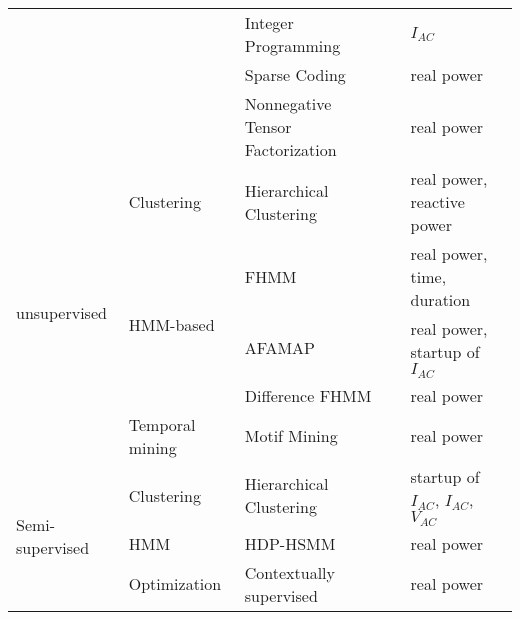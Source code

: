 \begin{table}[h]
\begin{center}
{\begin{tabular} {|l|l|l|l|l|}
\cline{3-5}
&& Integer Programming & \cite{suzuki2008nonintrusive} & $I_{AC}$ \\
\cline{3-5}
&&Sparse Coding & \cite{kolter2010sparse} & real power \\
\cline{3-5}
&& Nonnegative Tensor Factorization & \cite{figueiredo2014electrical} & real power \\
\hline
\hline
\multirow{5}{*}{unsupervised}  &\multirow{1}{*}{Clustering} & Hierarchical Clustering & \cite{gonccalves2011unsupervised} & real power, reactive power\\
\cline{2-5}
& \multirow{3}{*}{HMM-based}  &FHMM & \cite{kim2011unsupervised} & real power, time, duration\\
\cline{3-5}
& &AFAMAP & \cite{kolter2012aistat} & real power, startup of $I_{AC}$ \\
\cline{3-5}
& &Difference FHMM & \cite{parson2012nonintrusive}& real power \\
\cline{2-5}
&\multirow{1}{*}{Temporal mining}  & Motif Mining & \cite{shao2013temporal} & real power \\
\hline
\hline
\multirow{3}{*}{Semi-supervised}  & Clustering&Hierarchical Clustering & \cite{lam2007novel} & startup of $I_{AC}$, $I_{AC}$, $V_{AC}$ \\
\cline{2-5}
& HMM &HDP-HSMM & \cite{johnson2012bayesian} & real power \\
\cline{2-5}
& Optimization&Contextually supervised & \cite{wytock2014contextually} & real power \\
\hline
\end{tabular}
}
\end{center}
\end{table}
